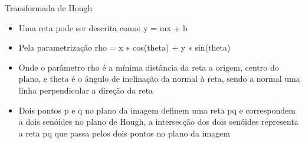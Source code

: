 \begin{frame}{Transformada de Hough}
    \begin{itemize}
        \item Uma reta pode ser descrita como:  y = mx + b
        \item Pela parametrização rho = x $∗$ cos(theta) + y $∗$ sin(theta)
        \item Onde o parâmetro rho é a mínima distância da reta a origem, centro do plano, e theta é o ângulo de inclinação da normal à reta, sendo a normal uma linha perpendicular a direção da reta
        \item Dois pontos p e q no plano da imagem definem uma reta pq e correspondem a dois senóides no plano de Hough, a intersecção dos dois senóides representa a reta pq que passa pelos dois pontos no plano da imagem
    \end{itemize}
\end{frame}